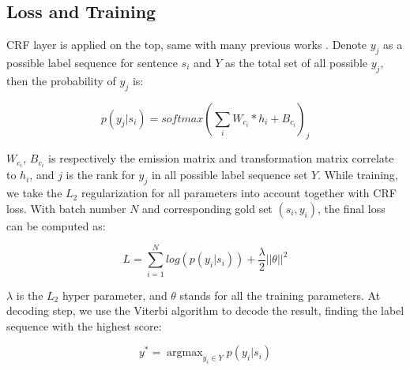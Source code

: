 \documentclass[letterpaper]{article} %
\begin{document}
\begin{table}[t]
\caption{Statistics of Sogou MusicNER dataset.}\smallskip
\centering
{}
\label{table1}
\end{table}



\subsection{Loss and Training}

CRF layer is applied on the top, same with many previous works \cite{nlp,char-fea1,mahovy,comb,lattice,lrcnn}. Denote $y_j$ as a possible label sequence for sentence $s_i$ and $Y$ as the total set of all possible $y_j$, then the probability of $y_j$ is:

\begin{equation}
p(y_j | s_i) = softmax(\sum_i{W_{c_i} * h_i} + B_{c_i})_j
\label{crf_probability}
\end{equation}

$W_{c_i}$, $B_{c_i}$ is respectively the emission matrix and transformation matrix correlate to $h_i$, and $j$ is the rank for $y_j$ in all possible label sequence set $Y$.  While training, we take the $L_2$ regularization for all parameters into account together with CRF loss. With batch number $N$ and corresponding gold set $(s_i, y_i)$, the final loss can be computed as:

\begin{equation}
L = \sum_{i=1}^{N}{log(p(y_i | s_i))} + \frac{\lambda}{2}{|| \theta ||}^2
\label{crf_probability}
\end{equation}

$\lambda$ is the $L_2$ hyper parameter, and $\theta$ stands for all the training parameters. At decoding step, we use the Viterbi algorithm \cite{viterbi} to decode the result, finding the label sequence with the highest score: 

\begin{equation}
y^* = \mathop{\arg\max}_{y_i \in Y}{p(y_i | s_i)}
\label{crf_decode}
\end{equation}
\end{document}
